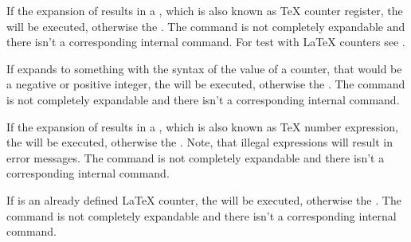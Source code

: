 \begin{Declaration}
\end{Declaration}
%
If the expansion of results in
a , which is also known as \TeX{} counter register, the
 will be executed, otherwise the . The command is not completely expandable and there isn't a
corresponding internal command. For test with \LaTeX{} counters see
.%
%

\begin{Declaration}
\end{Declaration}
%
If  expands to something with
the syntax of the value of a counter, that would be a negative or positive
integer, the  will be executed, otherwise the
. The command is not completely expandable and there
isn't a corresponding internal command.%
%

\begin{Declaration}
\end{Declaration}
%
If the expansion of results in
a , which is also known as \TeX{} number expression, the
 will be executed, otherwise the . Note, that illegal expressions will
result in error messages. The command is not completely expandable and there
isn't a corresponding internal command.%
%

\begin{Declaration}
\end{Declaration}
%
If  is an already defined
\LaTeX{} counter, the  will be executed, otherwise
the .  The command is not completely expandable and
there isn't a corresponding internal command.%
%

